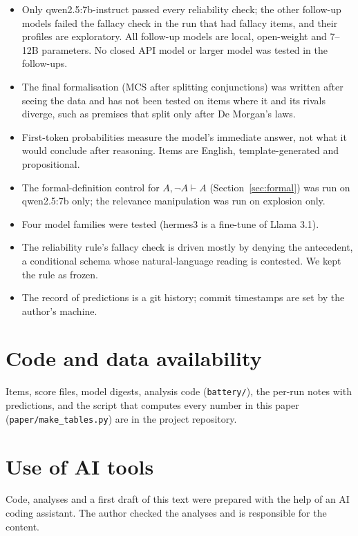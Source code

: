 \documentclass[11pt]{article}
\begin{document}
\begin{itemize}
\item Only qwen2.5:7b-instruct passed every reliability check; the other follow-up models failed the
fallacy check in the run that had fallacy items, and their profiles are exploratory. All follow-up models
are local, open-weight and 7--12B parameters. No closed API model or larger model was tested in the
follow-ups.
\item The final formalisation (MCS after splitting conjunctions) was written after seeing the data and
has not been tested on items where it and its rivals diverge, such as premises that split only after De
Morgan's laws.
\item First-token probabilities measure the model's immediate answer, not what it would conclude after
reasoning. Items are English, template-generated and propositional.
\item The formal-definition control for $A, \neg A \vdash A$ (Section~\ref{sec:formal}) was run on
qwen2.5:7b only; the relevance manipulation was run on explosion only.
\item Four model families were tested (hermes3 is a fine-tune of Llama 3.1).
\item The reliability rule's fallacy check is driven mostly by denying the antecedent, a conditional
schema whose natural-language reading is contested. We kept the rule as frozen.
\item The record of predictions is a git history; commit timestamps are set by the author's machine.
\end{itemize}

\section*{Code and data availability}
Items, score files, model digests, analysis code (\texttt{battery/}), the per-run notes with predictions,
and the script that computes every number in this paper (\texttt{paper/make\_tables.py}) are in the
project repository.

\section*{Use of AI tools}
Code, analyses and a first draft of this text were prepared with the help of an AI coding assistant.
The author checked the analyses and is responsible for the content.
\end{document}
